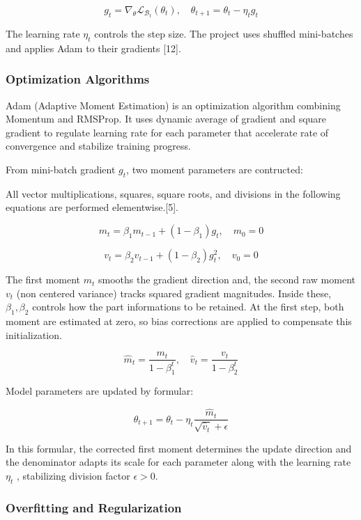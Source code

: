 \documentclass[11pt,a4paper]{article}
\begin{document}
\[
{g}_{t}={\nabla }_{\theta }{\mathcal{L}}_{{\mathcal{B}}_{t}}({\theta }_{t}),\quad {\theta }_{t+1}={\theta }_{t}-{\eta }_{t}{g}_{t}
\]

The learning rate \({\eta }_{t}\) controls the step size. The project uses shuffled mini-batches and applies Adam to their gradients [12].

\subsubsection{Optimization Algorithms}\label{theory:2.3.3}

Adam (Adaptive Moment Estimation) is an optimization algorithm combining Momentum and RMSProp. It uses dynamic average of gradient and square gradient to regulate learning rate for each parameter that accelerate rate of convergence and stabilize training progress.

From mini-batch gradient \({g}_{t}\), two moment parameters are contructed:

All vector multiplications, squares, square roots, and divisions in the following equations are performed elementwise.[5].

\[
{m}_{t}={\beta }_{1}{m}_{t-1}+(1-{\beta }_{1}){g}_{t},\quad {m}_{0}=0
\]

\[
{v}_{t}={\beta }_{2}{v}_{t-1}+(1-{\beta }_{2}){g}_{t}^{2},\quad {v}_{0}=0
\]

The first moment \({m}_{t}\) smooths the gradient direction and, the second raw moment \({v}_{t}\) (non centered variance) tracks squared gradient magnitudes. Inside these, \({\beta }_{1}, {\beta }_{2}\) controls how the part informations to be retained. At the first step, both moment are estimated at zero, so bias corrections are applied to compensate this initialization.

\[
{\hat{m}}_{t}=\frac{{m}_{t}}{1-{\beta }_{1}^{t}},\quad {\hat{v}}_{t}=\frac{{v}_{t}}{1-{\beta }_{2}^{t}}
\]

Model parameters are updated by formular:

\[
{\theta }_{t+1}={\theta }_{t}-{\eta }_{t}\frac{{\hat{m}}_{t}}{\sqrt{{\hat{v}}_{t}}+\epsilon }
\]

In this formular, the corrected first moment determines the update direction and the denominator adapts its scale for each parameter along with the learning rate \({\eta }_{t}\) , stabilizing division factor \(\epsilon >0\).

\subsubsection{Overfitting and Regularization}\label{theory:2.3.4}
\end{document}
